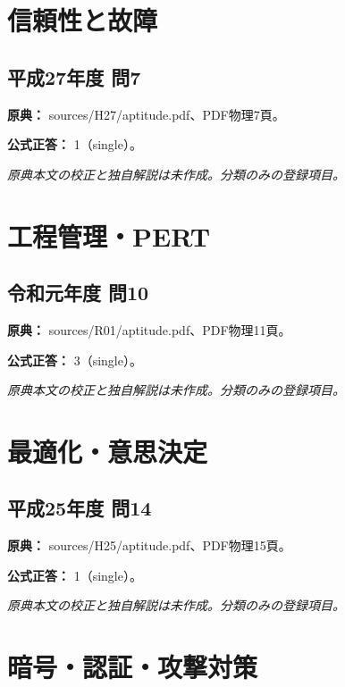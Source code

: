\section{信頼性と故障}

\subsection{平成27年度 問7}
\label{q:h27-reg-apt-07}

\noindent\textbf{原典：} sources/H27/aptitude.pdf、PDF物理7頁。

\textbf{公式正答：} 1（single）。

\par\textit{原典本文の校正と独自解説は未作成。分類のみの登録項目。}

\section{工程管理・PERT}

\subsection{令和元年度 問10}
\label{q:r01-reg-apt-10}

\noindent\textbf{原典：} sources/R01/aptitude.pdf、PDF物理11頁。

\textbf{公式正答：} 3（single）。

\par\textit{原典本文の校正と独自解説は未作成。分類のみの登録項目。}

\section{最適化・意思決定}

\subsection{平成25年度 問14}
\label{q:h25-reg-apt-14}

\noindent\textbf{原典：} sources/H25/aptitude.pdf、PDF物理15頁。

\textbf{公式正答：} 1（single）。

\par\textit{原典本文の校正と独自解説は未作成。分類のみの登録項目。}

\section{暗号・認証・攻撃対策}

